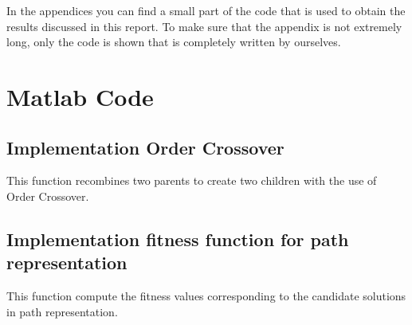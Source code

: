 


\begin{appendices}


In the appendices you can find a small part of the code that is used to obtain the results discussed in this report. To make sure that the appendix is not extremely long, only the code is shown that is completely written by ourselves. 

\section*{Matlab Code}


\subsection*{Implementation Order Crossover}
This function recombines two parents to create two children with the use of Order Crossover. 



\subsection*{Implementation fitness function for path representation}
This function compute the fitness values corresponding to the candidate solutions in path representation.








%
%
%
%


\end{appendices}
